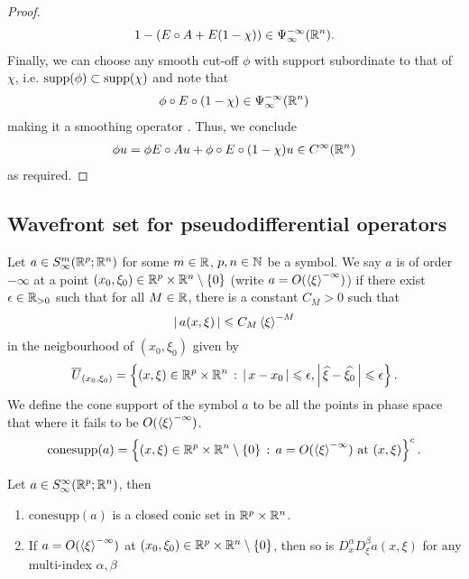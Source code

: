 \documentclass[12pt]{article}
\begin{document}
\begin{proof}
\begin{align*}
        1 - (E \circ A + E (1 - \chi)) \in \Psi^{-\infty}_\infty(\R^n). 
    \end{align*}
    Finally, we can choose any smooth cut-off $\phi$ with support subordinate to that of $\chi$, i.e. $\supp(\phi) \subset \supp(\chi)$ and note that 
    \begin{align*}
        \phi \circ E \circ (1 - \chi) \in \Psi^{-\infty}_\infty(\R^n)
    \end{align*}
    making it a smoothing operator \cite{}. Thus, we conclude 
    \begin{align*}
        \phi u = \phi E \circ A u + \phi \circ E \circ (1 - \chi) u \in C^\infty(\R^n)
    \end{align*}
    as required. 
    
    
    
    
\end{proof}

\subsection{Wavefront set for pseudodifferential operators}

\begin{fdefinition}
    Let $a \in S^{m}_\infty(\R^{p}; \R^n)$ for some $m \in \R$, $p, n \in \N$ be a symbol. We say $a$ is of order $-\infty$ at a point $(x_0, \xi_0) \in \R^p \times \R^n \setminus \set{0}$ (write $a = O(\sym[\xi]^{-\infty})$) if there exist $\epsilon \in \R_{> 0}$ such that for all $M \in \R$, there is a constant $C_M > 0$ such that 
    \[
    \abs{a(x, \xi)} \leq C_M \sym[\xi]^{-M}
    \]
    in the neigbourhood of $(x_0, \xi_0)$ given by
    \[
    \overline{U}_{(x_0, \xi_0)} = \set{(x, \xi) \in \R^p \times \R^n \wh \abs{x - x_0} \leq \epsilon, \abs{\widehat{\xi} - \widehat{\xi_0}} \leq \epsilon}. 
    \]
    We define the cone support of the symbol $a$ to be all the points in phase space that where it fails to be $O(\sym[\xi]^{-\infty})$. 
    \[
    \mathrm{conesupp}(a) = \set{(x, \xi) \in \R^p \times \R^n \setminus \set{0} \wh a = O(\sym[\xi]^{-\infty}) \text{ at } (x, \xi)}^c. 
    \]
\end{fdefinition}

\begin{flemma}
    Let $a \in S^{\infty}_\infty(\R^{p}; \R^n)$, then 
    \begin{enumerate}
        \item $\mathrm{conesupp}(a)$ is a closed conic set in $\R^p \times \R^n$. 
        \item If $a = O(\sym[\xi]^{-\infty})$ at $(x_0, \xi_0) \in \R^p \times \R^n \setminus \set{0}$, then so is $D^\alpha_x D^\beta_\xi a(x, \xi)$ for any multi-index $\alpha, \beta$
    \end{enumerate}
\end{flemma}
\end{document}
